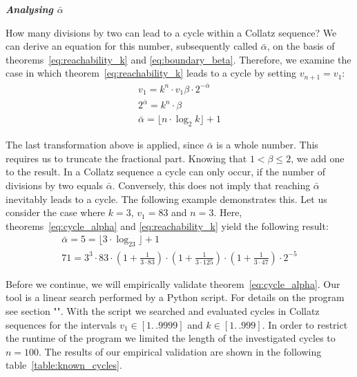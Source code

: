\documentclass{SciPress_2015}
\renewcommand{\subsection}[1]{\textit{\textbf{#1}}}
\begin{document}
\vspace{1em}\noindent
\subsection{Analysing \boldmath$\bar\alpha$}
\par\noindent
How many divisions by two can lead to a cycle within a Collatz sequence? We can derive an equation for this number, subsequently called $\bar\alpha$, on the basis of theorems~\ref{eq:reachability_k} and \ref{eq:boundary_beta}. Therefore, we examine the case in which theorem~\ref{eq:reachability_k} leads to a cycle by setting  $v_{n+1}=v_1$:
\begin{equation}
\label{eq:cycle_alpha}
\begin{array}{c}
v_1=k^n\cdot v_1\beta\cdot2^{-\bar\alpha}\\
2^{\bar\alpha}=k^n\cdot\beta\\
\bar\alpha=\lfloor n\cdot\log_2k\rfloor+1
\end{array}
\end{equation}

\par\medskip
The last transformation above is applied, since $\bar\alpha$ is a whole number. This requires us to truncate the fractional part. Knowing that $1<\beta\le2$, we add one to the result. In a Collatz sequence a cycle can only occur, if the number of divisions by two equals $\bar\alpha$. Conversely, this does not imply that reaching $\bar\alpha$ inevitably leads to a cycle. The following example demonstrates this. Let us consider the case where $k=3$, $v_1=83$ and $n=3$. Here, theorems~\ref{eq:cycle_alpha} and \ref{eq:reachability_k} yield the following result:
\[
\begin{array}{c}
\bar\alpha=5=\lfloor3\cdot\log_23\rfloor+1\\
71=3^3\cdot83\cdot\left(1+\frac{1}{3\cdot83}\right)\cdot\left(1+\frac{1}{3\cdot125}\right)\cdot\left(1+\frac{1}{3\cdot47}\right)\cdot2^{-5}
\end{array}
\]

\par\medskip
Before we continue, we will empirically validate theorem~\ref{eq:cycle_alpha}. Our tool is a linear search performed by a Python script. For details on the program see section "". With the script we searched and evaluated cycles in Collatz sequences for the intervals $v_1\in[1\mathrel{{.}\,{.}}9999]$ and $k\in[1\mathrel{{.}\,{.}}999]$. In order to restrict the runtime of the program we limited the length of the investigated cycles to $n=100$. The results of our empirical validation are shown in the following table~\ref{table:known_cycles}.
\end{document}

